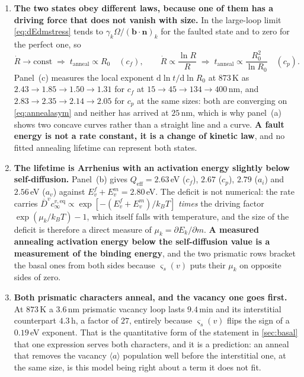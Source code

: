\documentclass{article}
\newcommand{\aloop}{\ensuremath{\langle a\rangle}}
\newcommand{\bvec}{\bm b}
\newcommand{\nvec}{\bm n}
\begin{document}
\begin{enumerate}
\item \textbf{The two states obey different laws, because one of them has a
      driving force that does not vanish with size.} In the large-loop limit
      \cref{eq:dEdmstress} tends to $\gamma_k\Omega/(\bvec\!\cdot\!\nvec)_k$ for
      the faulted state and to zero for the perfect one, so
      \begin{equation}
        \dot R\to\text{const}\;\Rightarrow\;t_{\mathrm{anneal}}\propto R_0
        \quad(c_f),
        \qquad
        \dot R\propto\frac{\ln R}{R}\;\Rightarrow\;
        t_{\mathrm{anneal}}\propto\frac{R_0^{2}}{\ln R_0}
        \quad(c_p).
        \label{eq:annealasym}
      \end{equation}
      Panel~(c) measures the local exponent $\mathrm d\ln t/\mathrm d\ln R_0$ at
      $873\,$K as $2.43\to1.85\to1.50\to1.31$ for $c_f$ at
      $15\to45\to134\to400\,$nm, and $2.83\to2.35\to2.14\to2.05$ for $c_p$ at the
      same sizes: both are converging on \cref{eq:annealasym} and neither has
      arrived at $25\,$nm, which is why panel~(a) shows two concave curves rather
      than a straight line and a curve. \textbf{A fault energy is not a
      rate constant, it is a change of kinetic law}, and no fitted annealing
      lifetime can represent both states.
\item \textbf{The lifetime is Arrhenius with an activation energy slightly below
      self-diffusion.} Panel~(b) gives $Q_{\mathrm{eff}}=2.63\,$eV ($c_f$),
      $2.67$ ($c_p$), $2.79$ ($a_i$) and $2.56\,$eV ($a_v$) against
      $E^f_v+E^m_v=2.80\,$eV. The deficit is not numerical: the rate carries
      $\overline D^{v}c^{v,\mathrm{eq}}_\infty\propto\exp[-(E^f_v+E^m_v)/k_BT]$
      \emph{times} the driving factor $\exp(\mu_k/k_BT)-1$, which itself falls
      with temperature, and the size of the deficit is therefore a direct measure
      of $\mu_k=\partial E_k/\partial m$. \textbf{A measured annealing activation
      energy below the self-diffusion value is a measurement of the binding
      energy}, and the two prismatic rows bracket the basal ones from both sides
      because $\varsigma_s(v)$ puts their $\mu_k$ on opposite sides of zero.
\item \textbf{Both prismatic characters anneal, and the vacancy one goes first.}
      At $873\,$K a $3.6\,$nm prismatic vacancy loop lasts $9.4\,$min and its
      interstitial counterpart $4.3\,$h, a factor of $27$, entirely because
      $\varsigma_s(v)$ flips the sign of a $0.19\,$eV exponent. That is the
      quantitative form of the statement in \cref{sec:basal} that one expression
      serves both characters, and it is a prediction: an anneal that removes the
      vacancy \aloop{} population well before the interstitial one, at the same
      size, is this model being right about a term it does not fit.
\end{enumerate}
\end{document}
